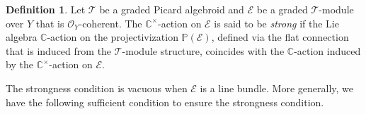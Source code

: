 \documentclass[12pt]{amsart}
\newcommand{\C}{\mathbb{C}}
\newcommand{\send}{\mathcal{E}nd}
\newcommand{\Id}{\operatorname{Id}}
\newcommand{\TT}{\mathscr{T}}
\newcommand{\cm}{\C^\times}
\newcommand{\OO}{\mathcal{O}}
\newcommand{\EE}{\mathcal{E}}
\newtheorem{Lem}[Thm]{Lemma}
\theoremstyle{definition}
\newtheorem{defi}[Thm]{Definition}
\numberwithin{equation}{section}
\begin{document}
\begin{defi} \label{defn:strong_cm}
	Let $\TT$ be a graded Picard algebroid and $\EE$ be a graded $\TT$-module over $Y$ that is $\OO_Y$-coherent. The $\cm$-action on $\EE$ is said to be \emph{strong} if the Lie algebra $\C$-action on the projectivization $\mathbb{P}(\EE)$, defined via the flat connection that is induced from the $\TT$-module structure, coincides with the $\C$-action induced by the $\cm$-action on $\EE$.
\end{defi}

The strongness condition is vacuous when $\EE$ is a line bundle. More generally, we have the following sufficient condition to ensure the strongness condition. 
\end{document}
